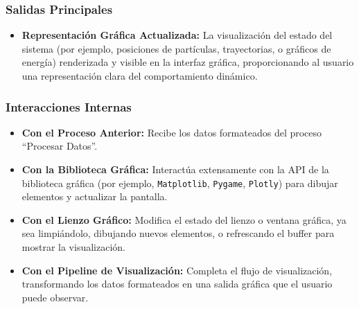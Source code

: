 \subsubsection{Salidas Principales}
\begin{itemize}
    \item \textbf{Representación Gráfica Actualizada:}
    La visualización del estado del sistema (por ejemplo, posiciones de partículas, trayectorias, o gráficos de energía) renderizada y visible en la interfaz gráfica, proporcionando al usuario una representación clara del comportamiento dinámico.
\end{itemize}

\subsubsection{Interacciones Internas}
\begin{itemize}
    \item \textbf{Con el Proceso Anterior:}
    Recibe los datos formateados del proceso ``Procesar Datos''.
    \item \textbf{Con la Biblioteca Gráfica:}
    Interactúa extensamente con la API de la biblioteca gráfica (por ejemplo, \texttt{Matplotlib}, \texttt{Pygame}, \texttt{Plotly}) para dibujar elementos y actualizar la pantalla.
    \item \textbf{Con el Lienzo Gráfico:}
    Modifica el estado del lienzo o ventana gráfica, ya sea limpiándolo, dibujando nuevos elementos, o refrescando el buffer para mostrar la visualización.
    \item \textbf{Con el Pipeline de Visualización:}
    Completa el flujo de visualización, transformando los datos formateados en una salida gráfica que el usuario puede observar.
\end{itemize}

